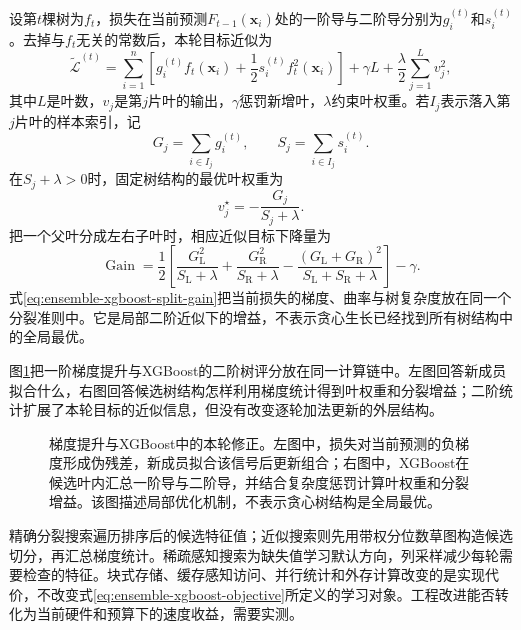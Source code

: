 设第$t$棵树为$f_t$，损失在当前预测$F_{t-1}(\bm{x}_i)$处的一阶导与二阶导分别为$g_i^{(t)}$和$s_i^{(t)}$。去掉与$f_t$无关的常数后，本轮目标近似为
\begin{equation}
  \widetilde{\mathcal{L}}^{(t)}
  =
  \sum_{i=1}^{n}
  \left[
    g_i^{(t)}f_t(\bm{x}_i)
    +\frac{1}{2}s_i^{(t)}f_t^2(\bm{x}_i)
  \right]
  +\gamma L
  +\frac{\lambda}{2}\sum_{j=1}^{L}v_j^2,
  \label{eq:ensemble-xgboost-objective}
\end{equation}
其中$L$是叶数，$v_j$是第$j$片叶的输出，$\gamma$惩罚新增叶，$\lambda$约束叶权重。若$I_j$表示落入第$j$片叶的样本索引，记
\[
  G_j=\sum_{i\in I_j}g_i^{(t)},
  \qquad
  S_j=\sum_{i\in I_j}s_i^{(t)}.
\]
在$S_j+\lambda>0$时，固定树结构的最优叶权重为
\begin{equation}
  v_j^\star=-\frac{G_j}{S_j+\lambda}.
  \label{eq:ensemble-xgboost-leaf-weight}
\end{equation}
把一个父叶分成左右子叶时，相应近似目标下降量为
\begin{equation}
  \operatorname{Gain}
  =
  \frac{1}{2}
  \left[
    \frac{G_{\mathrm{L}}^2}{S_{\mathrm{L}}+\lambda}
    +
    \frac{G_{\mathrm{R}}^2}{S_{\mathrm{R}}+\lambda}
    -
    \frac{(G_{\mathrm{L}}+G_{\mathrm{R}})^2}
         {S_{\mathrm{L}}+S_{\mathrm{R}}+\lambda}
  \right]
  -\gamma.
  \label{eq:ensemble-xgboost-split-gain}
\end{equation}
式\eqref{eq:ensemble-xgboost-split-gain}把当前损失的梯度、曲率与树复杂度放在同一个分裂准则中。它是局部二阶近似下的增益，不表示贪心生长已经找到所有树结构中的全局最优。

图\ref{fig:ensemble-gradient-xgboost}把一阶梯度提升与XGBoost的二阶树评分放在同一计算链中。左图回答新成员拟合什么，右图回答候选树结构怎样利用梯度统计得到叶权重和分裂增益；二阶统计扩展了本轮目标的近似信息，但没有改变逐轮加法更新的外层结构。

\begin{figure}[htbp]
  \centering
  
  \caption{梯度提升与XGBoost中的本轮修正。左图中，损失对当前预测的负梯度形成伪残差，新成员拟合该信号后更新组合；右图中，XGBoost在候选叶内汇总一阶导与二阶导，并结合复杂度惩罚计算叶权重和分裂增益。该图描述局部优化机制，不表示贪心树结构是全局最优。}
  \label{fig:ensemble-gradient-xgboost}
\end{figure}

精确分裂搜索遍历排序后的候选特征值；近似搜索则先用带权分位数草图构造候选切分，再汇总梯度统计。稀疏感知搜索为缺失值学习默认方向，列采样减少每轮需要检查的特征。块式存储、缓存感知访问、并行统计和外存计算改变的是实现代价，不改变式\eqref{eq:ensemble-xgboost-objective}所定义的学习对象。工程改进能否转化为当前硬件和预算下的速度收益，需要实测。

